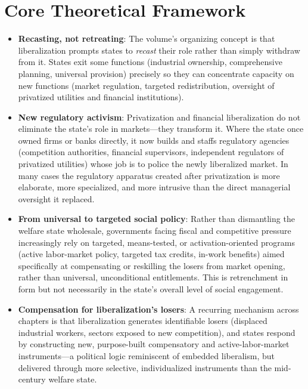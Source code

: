 \documentclass[12pt]{article}
\begin{document}
\section{Core Theoretical Framework}

\begin{itemize}[leftmargin=*, itemsep=4pt]
    \item \textbf{Recasting, not retreating}: The volume's organizing concept is that liberalization prompts states to \emph{recast} their role rather than simply withdraw from it. States exit some functions (industrial ownership, comprehensive planning, universal provision) precisely so they can concentrate capacity on new functions (market regulation, targeted redistribution, oversight of privatized utilities and financial institutions).
    \item \textbf{New regulatory activism}: Privatization and financial liberalization do not eliminate the state's role in markets---they transform it. Where the state once owned firms or banks directly, it now builds and staffs regulatory agencies (competition authorities, financial supervisors, independent regulators of privatized utilities) whose job is to police the newly liberalized market. In many cases the regulatory apparatus created after privatization is more elaborate, more specialized, and more intrusive than the direct managerial oversight it replaced.
    \item \textbf{From universal to targeted social policy}: Rather than dismantling the welfare state wholesale, governments facing fiscal and competitive pressure increasingly rely on targeted, means-tested, or activation-oriented programs (active labor-market policy, targeted tax credits, in-work benefits) aimed specifically at compensating or reskilling the losers from market opening, rather than universal, unconditional entitlements. This is retrenchment in form but not necessarily in the state's overall level of social engagement.
    \item \textbf{Compensation for liberalization's losers}: A recurring mechanism across chapters is that liberalization generates identifiable losers (displaced industrial workers, sectors exposed to new competition), and states respond by constructing new, purpose-built compensatory and active-labor-market instruments---a political logic reminiscent of embedded liberalism, but delivered through more selective, individualized instruments than the mid-century welfare state.

\end{itemize}
\end{document}
